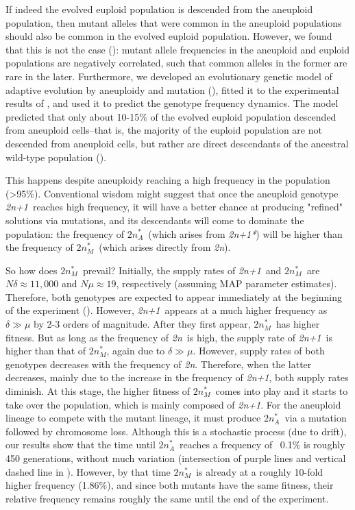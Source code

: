 \documentclass[12pt]{extarticle}
\newcommand{\euwt}{\emph{2n}}
\newcommand{\anwt}{\emph{2n+1}}
\newcommand{\eumtM}{\emph{$2n^*_M$}}
\newcommand{\eumtA}{\emph{$2n^*_A$}}
\newcommand{\anmt}{\emph{2n+1*}}
\begin{document}
If indeed the evolved euploid population is descended from the aneuploid population, then mutant alleles that were common in the aneuploid populations should also be common in the evolved euploid population.
However, we found that this is not the case (): mutant allele frequencies in the aneuploid and euploid populations are negatively correlated, such that common alleles in the former are rare in the later. 
Furthermore, we developed an evolutionary genetic model of adaptive evolution by aneuploidy and mutation (), fitted it to the experimental results of \citet{Yona2012}, and used it to predict the genotype frequency dynamics.
The model predicted that only about 10-15\% of the evolved euploid population descended from aneuploid cells--that is, the majority of the euploid population are not descended from aneuploid cells, but rather are direct descendants of the ancestral wild-type population ().

This happens despite aneuploidy reaching a high frequency in the population (>95\%). 
Conventional wisdom might suggest that once the aneuploid genotype \anwt\ reaches high frequency, it will have a better chance at producing "refined" solutions via mutations, and its descendants will come to dominate the population: the frequency of \eumtA\ (which arises from \anmt) will be higher than the frequency of \eumtM\ (which arises directly from \euwt).

So how does \eumtM\ prevail?
Initially, the supply rates of \anwt\ and \eumtM\ are $N \delta \approx 11,000$ and $N \mu \approx 19$, respectively (assuming MAP parameter estimates). 
Therefore, both genotypes are expected to appear immediately at the beginning of the experiment ().
However, \anwt\ appears at a much higher frequency as $\delta \gg \mu$ by 2-3 orders of magnitude.
After they first appear, \eumtM\ has higher fitness.
But as long as the frequency of \euwt\ is high, the supply rate of \anwt\ is higher than that of \eumtM, again due to $\delta \gg \mu$. 
However, supply rates of both genotypes decreases with the frequency of \euwt.
Therefore, when the latter decreases, mainly due to the increase in the frequency of \anwt, both supply rates diminish.
At this stage, the higher fitness of \eumtM\ comes into play and it starts to take over the population, which is mainly composed of \anwt.
For the aneuploid lineage to compete with the mutant lineage, it must produce \eumtA\ via a mutation followed by chromosome loss.
Although this is a stochastic process (due to drift), our results show that the time until \eumtA\ reaches a frequency of ~0.1\% is roughly 450 generations, without much variation (intersection of purple lines and vertical dashed line in ).
However, by that time \eumtM\ is already at a roughly 10-fold higher frequency (1.86\%), and since both mutants have the same fitness, their relative frequency remains roughly the same until the end of the experiment. 
\end{document}
